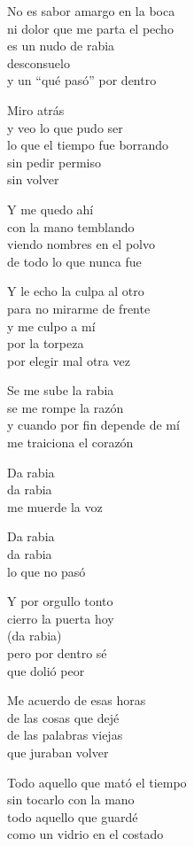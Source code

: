 \begin{lyrics}

No es sabor amargo en la boca\\
ni dolor que me parta el pecho\\
es un nudo de rabia\\
desconsuelo\\
y un “qué pasó” por dentro

Miro atrás\\
y veo lo que pudo ser\\
lo que el tiempo fue borrando\\
sin pedir permiso\\
sin volver

Y me quedo ahí\\
con la mano temblando\\
viendo nombres en el polvo\\
de todo lo que nunca fue

Y le echo la culpa al otro\\
para no mirarme de frente\\
y me culpo a mí\\
por la torpeza\\
por elegir mal otra vez

Se me sube la rabia\\
se me rompe la razón\\
y cuando por fin depende de mí\\
me traiciona el corazón

Da rabia\\
da rabia\\
me muerde la voz

Da rabia\\
da rabia\\
lo que no pasó

Y por orgullo tonto\\
cierro la puerta hoy\\
(da rabia)\\
pero por dentro sé\\
que dolió peor

Me acuerdo de esas horas\\
de las cosas que dejé\\
de las palabras viejas\\
que juraban volver

Todo aquello que mató el tiempo\\
sin tocarlo con la mano\\
todo aquello que guardé\\
como un vidrio en el costado


\end{lyrics}
